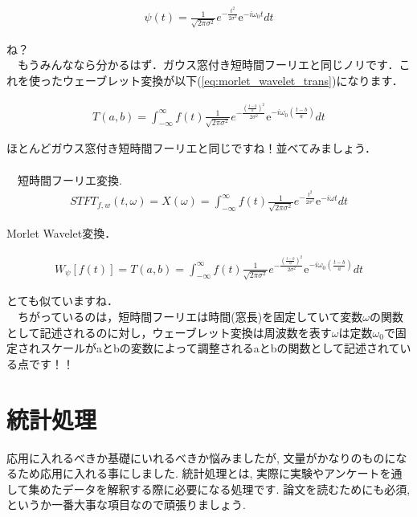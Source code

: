 \documentclass[11pt,a4paper,uplatex]{ujreport} 	%
\begin{document}
\begin{eqnarray}
\psi(t) = \frac{1}{\sqrt{2\pi\sigma^2}}e^{-\frac{t^2}{2\sigma^2}}\mathrm{e}^{-i\omega_0 t} dt
\label{eq:morlet_wavelet}
\end{eqnarray}

ね？\\
　もうみんななら分かるはず．ガウス窓付き短時間フーリエと同じノリです．これを使ったウェーブレット変換が以下(\ref{eq:morlet_wavelet_trans})になります．

\begin{eqnarray}
T(a,b) =  \int_{-\infty}^{\infty} f(t) \frac{1}{\sqrt{2\pi\sigma^2}}e^{-\frac{(\frac{t-b}{a})^2}{2\sigma^2}}\mathrm{e}^{-i\omega_0 (\frac{t-b}{a})} dt
\label{eq:morlet_wavelet_trans}
\end{eqnarray}

ほとんどガウス窓付き短時間フーリエと同じですね！並べてみましょう．
\\\\
　短時間フーリエ変換.
\begin{eqnarray}
STFT_{f,w}(t, \omega) = X(\omega) = \int_{-\infty}^{\infty} f(t) \frac{1}{\sqrt{2\pi\sigma^2}}e^{-\frac{t^2}{2\sigma^2}}\mathrm{e}^{-i\omega t} dt
\end{eqnarray}


Morlet Wavelet変換．


\begin{eqnarray}
W_\psi[f(t)] = T(a,b) =  \int_{-\infty}^{\infty} f(t) \frac{1}{\sqrt{2\pi\sigma^2}}e^{-\frac{(\frac{t-b}{a})^2}{2\sigma^2}}\mathrm{e}^{-i\omega_0 (\frac{t-b}{a})} dt
\end{eqnarray}

とても似ていますね．\\
　ちがっているのは，短時間フーリエは時間(窓長)を固定していて変数$\omega$の関数として記述されるのに対し，ウェーブレット変換は周波数を表す$\omega$は定数$\omega_0$で固定されスケールがaとbの変数によって調整されるaとbの関数として記述されている点です！！\\







\chapter{統計処理}
応用に入れるべきか基礎にいれるべきか悩みましたが, 文量がかなりのものになるため応用に入れる事にしました. 統計処理とは, 実際に実験やアンケートを通して集めたデータを解釈する際に必要になる処理です. 論文を読むためにも必須, というか一番大事な項目なので頑張りましょう.
\end{document}
